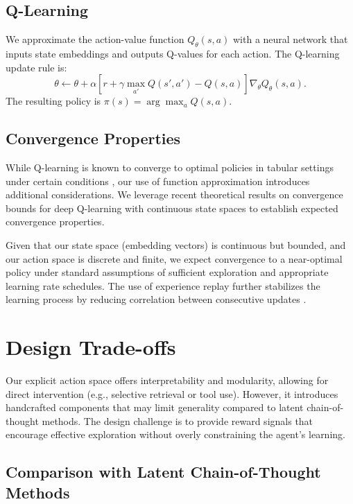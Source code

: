 \documentclass[10pt,journal,compsoc]{IEEEtran}
\begin{document}
\subsection{Q-Learning}

We approximate the action-value function $Q_\theta(s,a)$ with a
neural network that inputs state embeddings and outputs Q-values for
each action. The Q-learning update rule is:
\[
\theta \leftarrow \theta +
\alpha \left[ r + \gamma \max_{a'} Q(s',a') - Q(s,a) \right] \nabla_\theta Q_\theta(s,a).
\]
The resulting policy is $\pi(s) = \arg\max_a Q(s,a)$.

\subsection{Convergence Properties}

While Q-learning is known to converge to optimal policies in tabular settings under certain conditions \citep{watkins1992q}, our use of function approximation introduces additional considerations. We leverage recent theoretical results on convergence bounds for deep Q-learning with continuous state spaces \citep{fan2020theoretical} to establish expected convergence properties.

Given that our state space (embedding vectors) is continuous but bounded, and our action space is discrete and finite, we expect convergence to a near-optimal policy under standard assumptions of sufficient exploration and appropriate learning rate schedules. The use of experience replay further stabilizes the learning process by reducing correlation between consecutive updates \citep{mnih2015human}.

\section{Design Trade-offs}

Our explicit action space offers interpretability and modularity,
allowing for direct intervention (e.g., selective retrieval or tool
use). However, it introduces handcrafted components that may limit
generality compared to latent chain-of-thought methods. The design
challenge is to provide reward signals that encourage effective
exploration without overly constraining the agent's learning.

\subsection{Comparison with Latent Chain-of-Thought Methods}
\end{document}
